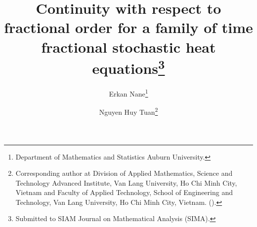 

\usepackage{lipsum}
\usepackage{amsfonts}
\usepackage{graphicx}
\usepackage{epstopdf}
\usepackage{algorithmic}
\ifpdf
\else
\fi

\newcommand{\creflastconjunction}{, and~}



\title{Continuity  with respect to   fractional order   for a family of time fractional  stochastic  heat equations\thanks{Submitted to SIAM Journal on Mathematical Analysis (SIMA).
}}

\author{Erkan Nane\thanks{Department of Mathematics and Statistics
		Auburn University. }
\and Nguyen Huy Tuan\thanks{Corresponding author at Division of Applied Mathematics, Science and Technology Advanced Institute,  Van Lang University, Ho Chi Minh City, Vietnam and Faculty of Applied Technology, School of Engineering and Technology, Van Lang University, Ho Chi Minh City, Vietnam. ().}}

\usepackage{amsopn}
\DeclareMathOperator{\diag}{diag}



